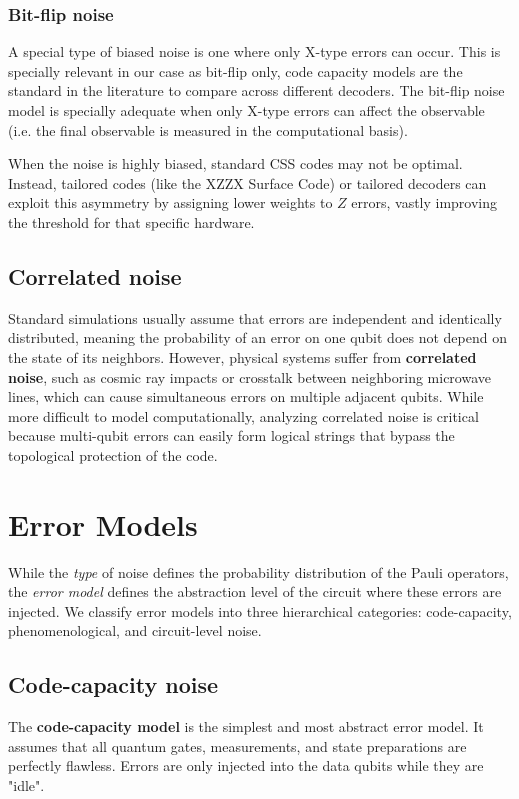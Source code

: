 \subsubsection{Bit-flip noise}
A special type of biased noise is one where only X-type errors can occur. This is specially relevant in our case as bit-flip only, code capacity models are the standard in the literature to compare across different decoders. The bit-flip noise model is specially adequate when only X-type errors can affect the observable (i.e. the final observable is measured in the computational basis).

 When the noise is highly biased, standard CSS codes may not be optimal. Instead, tailored codes (like the XZZX Surface Code) or tailored decoders can exploit this asymmetry by assigning lower weights to $Z$ errors, vastly improving the threshold for that specific hardware.

\subsection{Correlated noise}
Standard simulations usually assume that errors are independent and identically distributed, meaning the probability of an error on one qubit does not depend on the state of its neighbors. However, physical systems suffer from \textbf{correlated noise}, such as cosmic ray impacts or crosstalk between neighboring microwave lines, which can cause simultaneous errors on multiple adjacent qubits. While more difficult to model computationally, analyzing correlated noise is critical because multi-qubit errors can easily form logical strings that bypass the topological protection of the code.

\section{Error Models}
\label{sec:error_models}
While the \textit{type} of noise defines the probability distribution of the Pauli operators, the \textit{error model} defines the abstraction level of the circuit where these errors are injected. We classify error models into three hierarchical categories: code-capacity, phenomenological, and circuit-level noise.

\subsection{Code-capacity noise}
 The \textbf{code-capacity model} is the simplest and most abstract error model. It assumes that all quantum gates, measurements, and state preparations are perfectly flawless. Errors are only injected into the data qubits while they are "idle".

